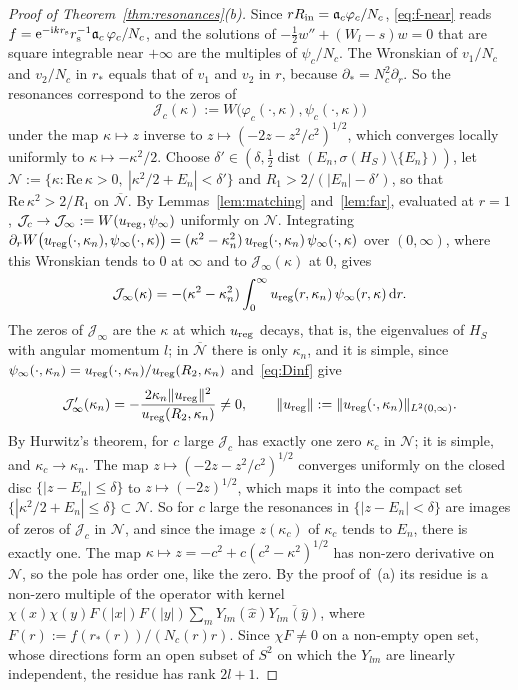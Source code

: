 \documentclass[%
 aip,
 jmp,
 amsmath,amssymb,
 reprint, onecolumn
]{revtex4-1}
\theoremstyle{definition}
\theoremstyle{remark}
\newcommand{\rmd}{\mathrm{d}}
\newcommand{\rmi}{\mathrm{i}}
\newcommand{\rme}{\mathrm{e}}
\begin{document}
\begin{proof}[Proof of Theorem~\ref{thm:resonances}(b)]
Since $rR_{\rm in}=\mathfrak a_c\varphi_c/N_c$, \eqref{eq:f-near} reads
$f=\rme^{-\rmi kr_{\rm s}}r_{\rm s}^{-1}\mathfrak a_c\,\varphi_c/N_c$, and the
solutions of $-\frac12w''+(W_l-s)w=0$ that are square integrable near
$+\infty$ are the multiples of $\psi_c/N_c$. The Wronskian of
$v_1/N_c$ and $v_2/N_c$ in $r_*$ equals that of $v_1$ and $v_2$ in $r$,
because $\partial_*=N_c^2\partial_r$. So the resonances correspond to the
zeros of
\[
\mathcal J_c(\kappa):=W\bigl(\varphi_c(\cdot,\kappa),\psi_c(\cdot,\kappa)\bigr)
\]
under the map $\kappa\mapsto z$ inverse to $z\mapsto(-2z-z^2/c^2)^{1/2}$,
which converges locally uniformly to $\kappa\mapsto-\kappa^2/2$. Choose
$\delta'\in(\delta,\frac12\operatorname{dist}(E_n,\sigma(H_S)\setminus
\{E_n\}))$, let $\mathcal N:=\{\kappa:\mathrm{Re}\,\kappa>0,\ |\kappa^2/2+E_n|<
\delta'\}$ and $R_1>2/(|E_n|-\delta')$, so that $\mathrm{Re}\,\kappa^2>
2/R_1$ on $\overline{\mathcal N}$. By Lemmas~\ref{lem:matching} and~\ref{lem:far},
evaluated at $r=1$, $\mathcal J_c\to \mathcal J_\infty:=W(u_{\rm reg},\psi_\infty)$
uniformly on $\mathcal N$. Integrating
$\partial_rW\bigl(u_{\rm reg}(\cdot,\kappa_n),\psi_\infty(\cdot,\kappa)
\bigr)=(\kappa^2-\kappa_n^2)\,u_{\rm reg}(\cdot,\kappa_n)\,
\psi_\infty(\cdot,\kappa)$ over $(0,\infty)$, where this Wronskian tends
to $0$ at $\infty$ and to $\mathcal J_\infty(\kappa)$ at $0$, gives
\begin{equation}\label{eq:Dinf}
\mathcal J_\infty(\kappa)=-(\kappa^2-\kappa_n^2)\int_0^\infty u_{\rm reg}(r,
\kappa_n)\,\psi_\infty(r,\kappa)\,\rmd r .
\end{equation}
The zeros of $\mathcal J_\infty$ are the $\kappa$ at which $u_{\rm reg}$ decays,
that is, the eigenvalues of $H_S$ with angular momentum $l$; in $\overline{\mathcal N}$
there is only $\kappa_n$, and it is simple, since
$\psi_\infty(\cdot,\kappa_n)=u_{\rm reg}(\cdot,\kappa_n)/u_{\rm reg}(R_2,
\kappa_n)$ and~\eqref{eq:Dinf} give
\[
\mathcal J_\infty'(\kappa_n)=-\frac{2\kappa_n\|u_{\rm reg}\|^2}
{u_{\rm reg}(R_2,\kappa_n)}\neq0,\qquad
\|u_{\rm reg}\|:=\|u_{\rm reg}(\cdot,\kappa_n)\|_{L^2(0,\infty)} .
\]
By Hurwitz's theorem, for $c$ large $\mathcal J_c$ has exactly one zero
$\kappa_c$ in $\mathcal N$; it is simple, and $\kappa_c\to\kappa_n$. The map
$z\mapsto(-2z-z^2/c^2)^{1/2}$ converges uniformly on the closed disc
$\{|z-E_n|\leq\delta\}$ to $z\mapsto(-2z)^{1/2}$, which maps it into the
compact set $\{|\kappa^2/2+E_n|\leq\delta\}\subset\mathcal N$. So for $c$
large the resonances in $\{|z-E_n|<\delta\}$ are images of zeros of
$\mathcal J_c$ in $\mathcal N$, and since the image $z(\kappa_c)$ of $\kappa_c$ tends
to $E_n$, there is exactly one. The map $\kappa\mapsto z=-c^2+c(c^2-
\kappa^2)^{1/2}$ has non-zero derivative on $\mathcal N$, so the pole has order
one, like the zero. By the proof of~(a) its residue is a non-zero
multiple of the operator with kernel $\chi(x)\chi(y)F(|x|)F(|y|)
\sum_mY_{lm}(\hat x)\overline{Y_{lm}(\hat y)}$, where
$F(r):=f(r_*(r))/(N_c(r)r)$. Since $\chi F\neq0$ on a non-empty open
set, whose directions form an open subset of $S^2$ on which the
$Y_{lm}$ are linearly independent, the residue has rank $2l+1$.
\end{proof}
\end{document}
